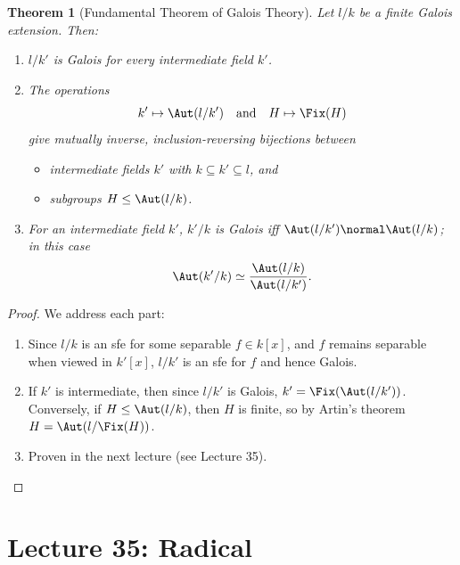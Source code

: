 \documentclass[a4paper,12pt]{article}
\newtheorem{thm}{Theorem}[section]
\begin{document}
\begin{thm}[Fundamental Theorem of Galois Theory]
    Let $l/k$ be a finite Galois extension. Then:
    \begin{enumerate}
        \item $l/k'$ is Galois for every intermediate field $k'$.
        \item The operations
        \[
        k'\mapsto \Aut(l/k') \quad\text{and}\quad H\mapsto \Fix(H)
        \]
        give mutually inverse, inclusion-reversing bijections between
        \begin{itemize}
            \item intermediate fields $k'$ with $k\subseteq k'\subseteq l$, and
            \item subgroups $H\leq \Aut(l/k)$.
        \end{itemize}
        \item For an intermediate field $k'$, $k'/k$ is Galois iff $\Aut(l/k')\normal \Aut(l/k)$; in this case
        \[
        \Aut(k'/k)\simeq \frac{\Aut(l/k)}{\Aut(l/k')}.
        \]
    \end{enumerate}
\end{thm}
\begin{proof}
    We address each part:
    \begin{enumerate}
        \item Since $l/k$ is an sfe for some separable $f\in k[x]$, and $f$ remains separable when viewed in $k'[x]$, $l/k'$ is an sfe for $f$ and hence Galois.
        \item If $k'$ is intermediate, then since $l/k'$ is Galois, $k'=\Fix(\Aut(l/k'))$. Conversely, if $H\leq \Aut(l/k)$, then $H$ is finite, so by Artin's theorem $H=\Aut(l/\Fix(H))$.
        \item Proven in the next lecture (see Lecture 35).
    \end{enumerate}
\end{proof}
\newpage
\section{Lecture 35: Radical}
\end{document}
